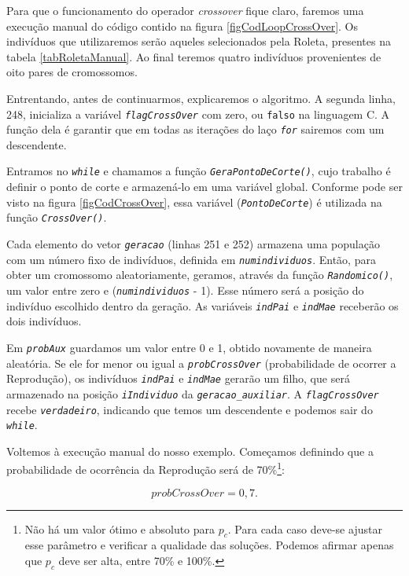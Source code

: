 	Para que o funcionamento do operador \textit{crossover} fique claro, faremos uma execução manual do código contido na figura \ref{figCodLoopCrossOver}. Os indivíduos que utilizaremos serão aqueles selecionados pela Roleta, presentes na tabela \ref{tabRoletaManual}. Ao final teremos quatro indivíduos provenientes de oito pares de cromossomos.
	
	Entrentando, antes de continuarmos, explicaremos o algoritmo.	A segunda linha, 248, inicializa a variável \textit{\texttt{flagCrossOver}} com zero, ou \texttt{falso} na linguagem C. A função dela é garantir que em todas as iterações do laço \textit{\texttt{for}} sairemos com um descendente.
	
	Entramos no \textit{\texttt{while}} e chamamos a função \textit{\texttt{GeraPontoDeCorte()}}, cujo trabalho é definir o ponto de corte e armazená-lo em uma variável global. Conforme pode ser visto na figura \ref{figCodCrossOver}, essa variável (\textit{\texttt{PontoDeCorte}}) é utilizada na função \textit{\texttt{CrossOver()}}.
	
	Cada elemento do vetor \textit{\texttt{geracao}} (linhas 251 e 252) armazena uma população com um número fixo de indivíduos, definida em \textit{\texttt{numindividuos}}. Então, para obter um cromossomo aleatoriamente, geramos, através da função \textit{\texttt{Randomico()}}, um valor entre zero e (\textit{\texttt{numindividuos}} - 1). Esse número será a posição do indivíduo escolhido dentro da geração. 	As variáveis \textit{\texttt{indPai}} e \textit{\texttt{indMae}} receberão os dois indivíduos. 
	
	Em \textit{\texttt{probAux}} guardamos um valor entre 0 e 1, obtido novamente de maneira aleatória. Se ele for menor ou igual a \textit{\texttt{probCrossOver}} (probabilidade de ocorrer a Reprodução), os indivíduos \textit{\texttt{indPai}} e \textit{\texttt{indMae}} gerarão um filho, que será armazenado na posição \textit{\texttt{iIndividuo}} da \textit{\texttt{geracao\_auxiliar}}. A \textit{\texttt{flagCrossOver}} recebe \textit{\texttt{verdadeiro}}, indicando que temos um descendente e podemos sair do \textit{\texttt{while}}.
	
	Voltemos à execução manual do nosso exemplo. Começamos definindo que a probabilidade de ocorrência da Reprodução será de 70\%\footnote{Não há um valor ótimo e absoluto para $p_c$. Para cada caso deve-se ajustar esse parâmetro e verificar a qualidade das soluções. Podemos afirmar apenas que $p_c$ deve ser alta, entre 70\% e 100\%.}:
	
	$$
		probCrossOver = 0,7.
	$$	
	
